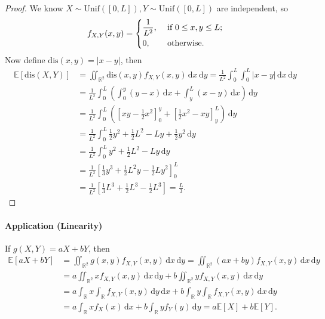 \begin{proof}
    We know \(X \sim \mathrm{Unif}([0, L]), Y \sim \mathrm{Unif}([0, L])  \) are independent, so 
    \[
        f_{X, Y}(x, y) = \begin{dcases}
            \frac{1}{L^2}, &\text{ if } 0 \le x, y \le L ;\\
            0, &\text{ otherwise} .
        \end{dcases}
    \]
    Now define \(\mathrm{dis}(x, y) = \vert x - y \vert  \), then 
    \begin{align*}
        \mathbb{E} [\mathrm{dis}(X, Y)] &= \iint_{\mathbb{R} ^2} \mathrm{dis}(x, y) f_{X, Y}(x, y) \, \mathrm{d} x \, \mathrm{d} y = \frac{1}{L^2} \int _0^L \int _0^L \vert x - y \vert \, \mathrm{d} x \, \mathrm{d} y \\
        &= \frac{1}{L^2} \int _0^L \left( \int _0^y (y - x) \, \mathrm{d} x + \int _y^L (x - y) \, \mathrm{d} x   \right) \, \mathrm{d} y \\
        &= \frac{1}{L^2} \int _0^L \left( \left[ xy - \frac{1}{2}x^2 \right]_0^y + \left[ \frac{1}{2}x^2 - xy \right]_y^L   \right) \, \mathrm{d} y \\
        &= \frac{1}{L^2} \int _0^L \frac{1}{2} y^2 + \frac{1}{2} L^2 - Ly + \frac{1}{2} y^2 \, \mathrm{d} y \\
        &= \frac{1}{L^2} \int _0^L y^2 + \frac{1}{2} L^2 - Ly \, \mathrm{d} y \\
        &= \frac{1}{L^2} \left[ \frac{1}{3} y^3 + \frac{1}{2} L^2 y - \frac{1}{2} L y^2 \right]_0^L \\
        &= \frac{1}{L^2} \left[ \frac{1}{3}L^3 + \frac{1}{2} L^3 - \frac{1}{2} L^3 \right] = \frac{L}{3}.             
    \end{align*}

\end{proof}

\paragraph{Application (Linearity)} If \(g(X, Y) = aX + bY\), then 
\begin{align*}
    \mathbb{E} [aX + bY] &= \iint_{\mathbb{R} ^2} g(x, y) f_{X, Y}(x, y) \, \mathrm{d} x \, \mathrm{d} y = \iint_{\mathbb{R} ^2} (ax + by) f_{X, Y}(x, y) \, \mathrm{d} x \, \mathrm{d} y \\
    &= a \iint_{\mathbb{R} ^2} x f_{X, Y}(x, y) \, \mathrm{d} x \, \mathrm{d} y + b \iint_{\mathbb{R} ^2} y f_{X, Y}(x, y) \, \mathrm{d} x \, \mathrm{d} y \\
    &= a \int _{\mathbb{R} } x \int_{\mathbb{R} } f_{X, Y}(x, y) \, \mathrm{d} y \, \mathrm{d} x + b \int _{\mathbb{R} } y \int _{\mathbb{R} } f_{X, Y}(x, y) \, \mathrm{d} x \, \mathrm{d} y \\
    &= a \int _{\mathbb{R} } x f_X(x) \, \mathrm{d} x + b \int _{\mathbb{R} } y f_Y(y) \, \mathrm{d} y = a \mathbb{E} [X] + b\mathbb{E} [Y].        
\end{align*}

